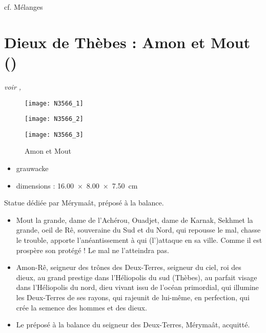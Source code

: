 \documentclass[dvipsnames,a4paper,twoside,10pt,openany,article]{memoir}
\begin{document}
\begin{remarque}
  cf. Mélanges 
\end{remarque}


\chapter{Dieux de Thèbes : Amon et Mout ()}
\label{sec:N3566}

\puceb{} \emph{voir , }
\bigskip

\begin{figure}[!h]
  \noi\begin{minipage}[t]{0.33\textwidth}%
    \centerfloat
    \texttt{[image: N3566\_1]}%
  \end{minipage}%
  \quad%
  \begin{minipage}[t]{0.33\textwidth}%
    \centerfloat
    \texttt{[image: N3566\_2]}%
  \end{minipage}%
  \quad%
  \begin{minipage}[t]{0.33\textwidth}%
    \centerfloat
    \texttt{[image: N3566\_3]}%
  \end{minipage}%
  \caption{Amon et Mout }%
  \label{fig:N3566}
\end{figure}

\begin{itemize}
  \item grauwacke
  \item dimensions : \SI{16.00x8.00x7.50}{\cm}
\end{itemize}

Statue dédiée par Mérymaât, préposé à la balance.

\begin{encadre}[font=\em, frametitle={Traduction}]
  \noi\begin{itemize}
    \item Mout la grande, dame de l'Achérou, Ouadjet, dame de Karnak, 
          Sekhmet la grande, oeil de Rê, souveraine du Sud et du Nord, 
          qui repousse le mal, chasse le trouble, apporte 
          l'anéantissement à qui (l')attaque en sa ville. Comme il est 
          prospère son protégé ! Le mal ne l'atteindra pas.
    \item Amon-Rê, seigneur des trônes des Deux-Terres, seigneur du 
          ciel, roi des dieux, au grand prestige dans l'Héliopolis du 
          sud (Thèbes), au parfait visage dans l'Héliopolis du nord, 
          dieu vivant issu de l'océan primordial, qui illumine les 
          Deux-Terres de ses rayons, qui rajeunit de lui-même, en 
          perfection, qui crée la semence des hommes et des dieux.
    \item Le préposé à la balance du seigneur des Deux-Terres, 
          Mérymaât, acquitté.
  \end{itemize}
\end{encadre}
\end{document}
